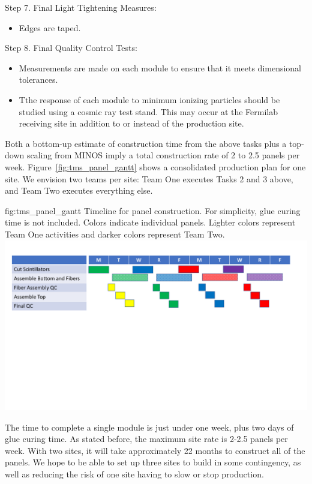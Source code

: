 Step 7. Final Light Tightening Measures:
\begin{itemize}
\item{Edges are taped.}
\end{itemize}

Step 8.	Final Quality Control Tests:
\begin{itemize}
\item{Measurements are made on each module to ensure that it meets dimensional tolerances. }
\item{Tthe response of each module to minimum ionizing particles should be studied using a cosmic ray test stand. This may occur at the Fermilab receiving site in addition to or instead of the production site.}
\end{itemize}

Both a bottom-up estimate of construction time from the above tasks plus a top-down scaling from MINOS imply a total construction rate of 2 to 2.5 panels per week. Figure~\ref{fig:tms_panel_gantt} shows a consolidated production plan for one site. We envision two teams per site: Team One executes Tasks 2 and 3 above, and Team Two executes everything else.

\begin{dunefigure}{fig:tms_panel_gantt}
{Timeline for panel construction. For simplicity, glue curing time is not included. Colors indicate individual panels. Lighter colors represent Team One activities and darker colors represent Team Two.}
\includegraphics[trim= 0 300 0 0,  clip,width=1.00\textwidth]{graphics/tms/TMS-Other/TMSPanelGantt.pdf} 
\end{dunefigure}

The time to complete a single module is just under one week, plus two days of glue curing time. As stated before, the maximum site rate is 2-2.5 panels per week. With two sites, it will take approximately 22 months to construct all of the panels. We hope to be able to set up three sites to build in some contingency, as well as reducing the risk of one site having to slow or stop production.

